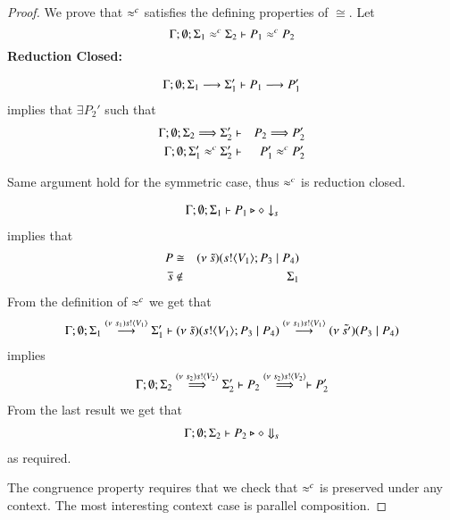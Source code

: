 \begin{proof}
	\noi We prove that $\approx^{c}$ satisfies the defining properties of $\cong$. Let 
%
	\[
		\Gamma; \emptyset; \Sigma_1 \approx^{c} \Sigma_2 \vdash P_1 \approx^{c} P_2
	\]
%
	{\bf Reduction Closed:}

	\begin{eqnarray*}
		\Gamma; \emptyset; \Sigma_1 \stackrel{}{\longrightarrow} \Sigma_1' \vdash P_1 \stackrel{}{\longrightarrow} P_1'
	\end{eqnarray*}
%
	\noi implies that 
	$\exists P_2'$ such that 
%
	\begin{eqnarray*}
		\Gamma; \emptyset; \Sigma_2 \stackrel{}{\Longrightarrow} \Sigma_2' &\vdash& P_2 \stackrel{}{\Longrightarrow} P_2'\\
		\Gamma; \emptyset; \Sigma_1' \approx^{c} \Sigma_2' &\vdash& P_1' \approx^{c} P_2'
	\end{eqnarray*}

	\noi Same argument hold for the symmetric case, thus $\approx^{c}$ is reduction closed.

%
	\begin{eqnarray*}
		\Gamma; \emptyset; \Sigma_1 \vdash P_1 \triangleright \diamond \downarrow_{s}
	\end{eqnarray*}
%
	implies that
	\begin{eqnarray*}
		P &\cong& (\nu\ \tilde{s})(s ! \langle V_1 \rangle ; P_3 \;|\; P_4)\\
		\overline{s} &\notin& \Sigma_1
	\end{eqnarray*}
%
	\noi From the definition of $\approx^{c}$ we get that
%
	\begin{eqnarray*}
		\Gamma; \emptyset; \Sigma_1 \stackrel{(\nu\ s_1) s ! \langle V_1 \rangle}{\longrightarrow} \Sigma_1' \vdash (\nu\ \tilde{s})(s ! \langle V_1 \rangle ; P_3 \;|\; P_4) \stackrel{(\nu\ s_1) s ! \langle V_1 \rangle}{\longrightarrow} (\nu\ \tilde{s'})(P_3 \;|\; P_4)
	\end{eqnarray*}
%
	\noi implies
%
	\begin{eqnarray*}
		\Gamma; \emptyset; \Sigma_2 \stackrel{(\nu\ s_2) s ! \langle V_2 \rangle}{\Longrightarrow} \Sigma_2' \vdash P_2 \stackrel{(\nu\ s_2) s ! \langle V_2 \rangle}{\Longrightarrow} \vdash P_2'
	\end{eqnarray*}
%
	\noi From the last result we get that
%
	\begin{eqnarray*}
		\Gamma; \emptyset; \Sigma_2 \vdash P_2 \triangleright \diamond \Downarrow_{s}
	\end{eqnarray*}
%
	\noi as required.


	\noi The congruence property requires that we check that $\approx^{c}$
	is preserved under any context.
	The most interesting context case is parallel composition.


\end{proof}
